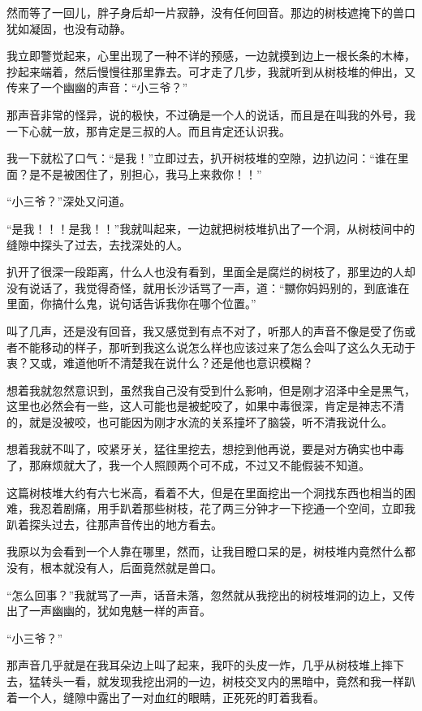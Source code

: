 然而等了一回儿，胖子身后却一片寂静，没有任何回音。那边的树枝遮掩下的兽口犹如凝固，也没有动静。

我立即警觉起来，心里出现了一种不详的预感，一边就摸到边上一根长条的木棒，抄起来端着，然后慢慢往那里靠去。可才走了几步，我就听到从树枝堆的伸出，又传来了一个幽幽的声音：“小三爷？”

那声音非常的怪异，说的极快，不过确是一个人的说话，而且是在叫我的外号，我一下心就一放，那肯定是三叔的人。而且肯定还认识我。

我一下就松了口气：“是我！”立即过去，扒开树枝堆的空隙，边扒边问：“谁在里面？是不是被困住了，别担心，我马上来救你！！”

“小三爷？”深处又问道。

“是我！！！是我！！”我就叫起来，一边就把树枝堆扒出了一个洞，从树枝间中的缝隙中探头了过去，去找深处的人。

扒开了很深一段距离，什么人也没有看到，里面全是腐烂的树枝了，那里边的人却没有说话了，我觉得奇怪，就用长沙话骂了一声，道：“嬲你妈妈别的，到底谁在里面，你搞什么鬼，说句话告诉我你在哪个位置。”

叫了几声，还是没有回音，我又感觉到有点不对了，听那人的声音不像是受了伤或者不能移动的样子，那听到我这么说怎么样也应该过来了怎么会叫了这么久无动于衷？又或，难道他听不清楚我在说什么？还是他也意识模糊？

想着我就忽然意识到，虽然我自己没有受到什么影响，但是刚才沼泽中全是黑气，这里也必然会有一些，这人可能也是被蛇咬了，如果中毒很深，肯定是神志不清的，就是没被咬，也可能因为刚才水流的关系撞坏了脑袋，听不清我说什么。

想着我就不叫了，咬紧牙关，猛往里挖去，想挖到他再说，要是对方确实也中毒了，那麻烦就大了，我一个人照顾两个可不成，不过又不能假装不知道。

这篇树枝堆大约有六七米高，看着不大，但是在里面挖出一个洞找东西也相当的困难，我忍着剧痛，用手趴着那些树枝，花了两三分钟才一下挖通一个空间，立即我趴着探头过去，往那声音传出的地方看去。

我原以为会看到一个人靠在哪里，然而，让我目瞪口呆的是，树枝堆内竟然什么都没有，根本就没有人，后面竟然就是兽口。

“怎么回事？”我就骂了一声，话音未落，忽然就从我挖出的树枝堆洞的边上，又传出了一声幽幽的，犹如鬼魅一样的声音。

“小三爷？”

那声音几乎就是在我耳朵边上叫了起来，我吓的头皮一炸，几乎从树枝堆上摔下去，猛转头一看，就发现我挖出洞的一边，树枝交叉内的黑暗中，竟然和我一样趴着一个人，缝隙中露出了一对血红的眼睛，正死死的盯着我看。

